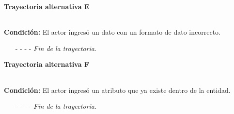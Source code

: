 \hypertarget{CU7-1-1-1:TAE}{\textbf{Trayectoria alternativa E}}\\
\noindent \textbf{Condición:} El actor ingresó un dato con un formato de dato incorrecto.
\begin{enumerate}
	\UCpaso[\UCsist] Muestra el mensaje  señalando el campo que presenta el error en la pantalla .
	\UCpaso Regresa al paso \ref{CU7.1.1-P3} de la trayectoria principal.
	\item[- -] - - {\em {Fin de la trayectoria}}.
\end{enumerate}
\hypertarget{CU7-1-1-1:TAF}{\textbf{Trayectoria alternativa F}}\\
\noindent \textbf{Condición:} El actor ingresó un atributo que ya existe dentro de la entidad.
\begin{enumerate}
	\UCpaso[\UCsist] Muestra el mensaje  señalando el campo que presenta la duplicidad en la pantalla .
	\UCpaso Regresa al paso \ref{CU7.1.1-P3} de la trayectoria principal.
	\item[- -] - - {\em {Fin de la trayectoria}}.
\end{enumerate}